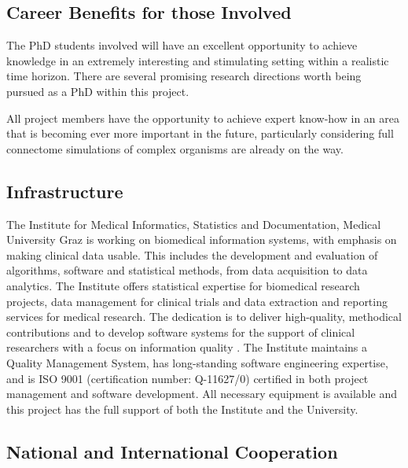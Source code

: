 \documentclass[a4paper,11pt]{article}
\begin{document}
\subsection{Career Benefits for those Involved}

The PhD students involved will have an excellent opportunity to achieve knowledge in an extremely interesting and stimulating setting within a realistic time horizon. There are several promising research directions worth being pursued as a PhD within this project. 

All project members have the opportunity to achieve expert know-how in an area that is becoming ever more important in the future, particularly considering full connectome simulations of complex organisms are already on the way.


\subsection{Infrastructure}

The Institute for Medical Informatics, Statistics and Documentation, Medical University Graz is working on biomedical information systems, with emphasis on making clinical data usable. This includes the development and evaluation of algorithms, software and statistical methods, from data acquisition to data analytics. The Institute offers statistical expertise for biomedical research projects, data management for clinical trials and data extraction and reporting services for medical research. The dedication is to deliver high-quality, methodical contributions and to develop software systems for the support of clinical researchers with a focus on information quality \citep{Holzinger:2011:InformationQuality}. The Institute maintains a Quality Management System, has long-standing software engineering expertise, and is ISO 9001 (certification number: Q-11627/0) certified in both project management and software development. All necessary equipment is available and this project has the full support of both the Institute and the University.


\subsection{National and International Cooperation}
\end{document}
